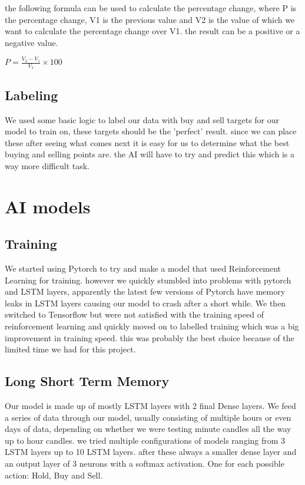 \documentclass[12pt,a4paper]{article}
\begin{document}
the following formula can be used to calculate the percentage change, where P is the percentage change, V1 is the previous value and V2 is the value of which we want to calculate the percentage change over V1. the result can be a positive or a negative value.

{\large \( P = \frac{ V_2 - V_1 }{ V_1 } \times 100 \)}

\subsection{Labeling}

We used some basic logic to label our data with buy and sell targets for our model to train on, these targets should be the 'perfect' result. since we can place these after seeing what comes next it is easy for us to determine what the best buying and selling points are. the AI will have to try and predict this which is a way more difficult task.

\section{AI models}
\subsection{Training}

We started using Pytorch to try and make a model that used Reinforcement Learning for training. however we quickly stumbled into problems with pytorch and LSTM layers, apparently the latest few versions of Pytorch have memory leaks in LSTM layers causing our model to crash after a short while.
We then switched to Tensorflow but were not satisfied with the training speed of reinforcement learning and quickly moved on to labelled training which was a big improvement in training speed. this was probably the best choice because of the limited time we had for this project.

\subsection{Long Short Term Memory}

Our model is made up of mostly LSTM layers with 2 final Dense layers.
We feed a series of data through our model, usually consisting of multiple hours or even days of data, depending on whether we were testing minute candles all the way up to hour candles.
we tried multiple configurations of models ranging from 3 LSTM layers up to 10 LSTM layers. after these always a smaller dense layer and an output layer of 3 neurons with a softmax activation. One for each possible action: Hold, Buy and Sell.
\end{document}

